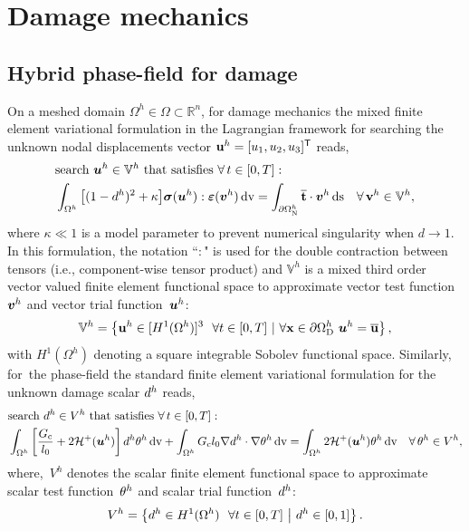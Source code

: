 \section{Damage mechanics}
\subsection{Hybrid phase-field for damage}
On a meshed domain $\Omega^h\in\Omega\subset\mathbb{R}^n$, for damage mechanics the mixed finite element variational formulation in the Lagrangian framework for searching the unknown nodal displacements vector ${\bf{u}}^h=[u_1,u_2,u_3]^\mathsf{T}$ reads,
%
%
\begin{equation}\label{Eq:VarfU}
\begin{aligned}
&\text{search}~\boldsymbol u^h\in\mathbb{V}^h \text{~that satisfies}~\forall\, t\in[0,T]:\\
&\int_{\Omega^h}\big[(1-d^h)^2 + \kappa \big]\boldsymbol{\sigma}(\boldsymbol u^h) : \boldsymbol{\varepsilon}(\boldsymbol v^h) \,\mathrm{d}\text{v}= \int_{\partial\Omega^h_\text{N}} \overline{{\bf t}}\cdot\boldsymbol v^h \,\mathrm{d}\text{s} \quad\forall\,{\bf{v}}^h\in\mathbb{V}^h,
\end{aligned}
\end{equation}
where $\kappa\ll1$ is a model parameter to prevent numerical singularity when $d \to 1$.
In this formulation, the notation ``$:$" is used for the double contraction between tensors (i.e., component-wise tensor product) and $ \mathbb{V}^h $ is a  mixed third order vector valued finite element functional space to approximate vector test function~$\boldsymbol v^h$ and vector trial function~$\boldsymbol u^h$:
\begin{equation}
\mathbb{V}^h=\left\{ {\bf{u}}^h\in [ {H}^1(\Omega^h) ]^3~~\forall t\in[0,T]~|~ \forall {\bf{x}}\in\partial\Omega^h_{\text{D}}~\boldsymbol u^h=\overline{{\bf{u}}}\right\},
\end{equation}
%
with ${H}^1(\Omega^h)$ denoting a square integrable Sobolev functional space.
Similarly, for~the phase-field the standard finite element variational formulation for the unknown damage scalar $d^h$ reads, 
%
%
\begin{equation}
\begin{aligned}\label{Eq:VarfPhi}
&\text{search}~d^h\in{{V}}^h \text{~that satisfies}~\forall\, t\in[0,T]:\\
&\int_{\Omega^h}\left[ \frac{G_{\text{c}}}{l_0} + 2 \mathcal{H}^{+}(\boldsymbol u^h) \right]d^h\theta^h\, \mathrm{d}\text{v} + \int_{\Omega^h} {G_{\text{c}}}{l_0}\nabla d^h \cdot \nabla\theta^h \, \mathrm{d}\text{v}= \int_{\Omega^h} 2\mathcal{H}^{+}(\boldsymbol u^h)\theta^h \, \mathrm{d}\text{v}\quad\forall\,\theta^h\in{{V}}^h, 
\end{aligned}
\end{equation}
%
%
where,~${{V}}^h$ denotes the scalar finite element functional space to approximate scalar test function~$\theta^h$ and scalar trial function~$d^h$:
\begin{equation}
{{V}}^h=\left\{d^h \in  {H}^1(\Omega^h)~~\forall t\in[0,T]~\middle|~d^h\in[0,1]  \right\}.
\end{equation}


